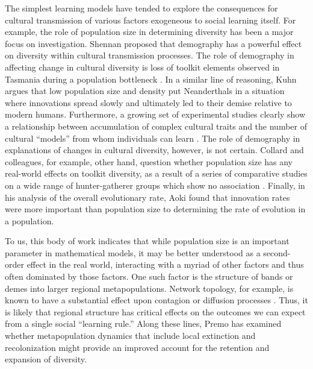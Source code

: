 \documentclass[referee,graybox,natbib]{svmult}
\begin{document}
The simplest learning models have tended to explore the consequences for
cultural transmission of various factors exogeneous to social learning
itself. For example, the role of population size in determining
diversity has been a major focus on investigation. Shennan
\citetext{\citeyear{shennan2000population}; \citeyear{shennan2001demography}}
proposed that demography has a powerful effect on diversity within
cultural transmission processes. The role of demography in affecting
change in cultural diversity is loss of toolkit elements observed in
Tasmania during a population bottleneck \citep{henrich2004}. In a
similar line of reasoning, Kuhn \citeyearpar{Kuhn2013Cultural-Transm}
argues that low population size and density put Neanderthals in a
situation where innovations spread slowly and ultimately led to their
demise relative to modern humans. Furthermore, a growing set of
experimental studies clearly show a relationship between accumulation of
complex cultural traits and the number of cultural ``models'' from whom
individuals can learn
\citep{muthukrishna2014sociality, derex2013experimental, kempe2014experimental}.
The role of demography in explanations of changes in cultural diversity,
however, is not certain. Collard and colleagues, for example, other
hand, question whether population size has any real-world effects on
toolkit diversity, as a result of a series of comparative studies on a
wide range of hunter-gatherer groups which show no association
\citep{collard2011drives, collard2013population, collard2013risk, collard2013plos}.
Finally, in his analysis of the overall evolutionary rate, Aoki
\citeyearpar{Aoki2013Determinants-of} found that innovation rates were
more important than population size to determining the rate of evolution
in a population.

To us, this body of work indicates that while population size is an
important parameter in mathematical models, it may be better understood
as a second-order effect in the real world, interacting with a myriad of
other factors and thus often dominated by those factors. One such factor
is the structure of bands or demes into larger regional metapopulations.
Network topology, for example, is known to have a substantial effect
upon contagion or diffusion processes
\citep[e.g.,][]{castellano2009statistical, smilkov2012influence}. Thus,
it is likely that regional structure has critical effects on the
outcomes we can expect from a single social ``learning rule.'' Along
these lines, Premo \citeyearpar{premo2012local} has examined whether
metapopulation dynamics that include local extinction and recolonization
might provide an improved account for the retention and expansion of
diversity.
\end{document}
